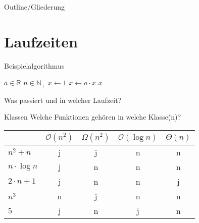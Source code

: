 
\subtitle{Foliensatz 9}
\date{20. Dezember 2012}



\begin{frame}
    \titlepage
\end{frame}

\begin{frame}{Outline/Gliederung}
    \tableofcontents
\end{frame}



\section{Laufzeiten}
\begin{frame}{Beispielalgorithmus}
    \begin{algorithm}
        \begin{algorithmic}
            \Require $a \in \mathbb{R}$
            \Require $n \in \mathbb{N}_+$
            \State $x \gets 1$
                \State $x\gets a\cdot x$
            \EndFor
            \Ensure $x$
        \end{algorithmic}
    \end{algorithm}
    Was passiert und in welcher Laufzeit?
\end{frame}
\begin{frame}{Klassen}
    Welche Funktionen gehören in welche Klasse(n)?
    \begin{table}
        \centering
        \begin{tabular}{lcccc}
            \toprule
            & $\mathcal{O}\left( n^2 \right)$ & $\Omega\left( n^2 \right)$ & $\mathcal{O}\left( \log n \right)$ & $\Theta\left( n \right)$\\
             \midrule
             $n^2 + n$ & j & j & n & n\\
             $n\cdot \log n$ & j & n & n & n\\
             $2\cdot n + 1$ & j & n & n & j\\
             $n^3$ & n & j & n & n\\
             $5$ & j & n & j & n\\
             \bottomrule
        \end{tabular}
    \end{table}
\end{frame}


